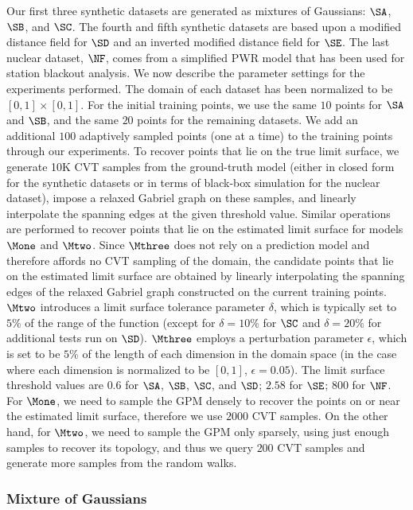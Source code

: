 Our first three synthetic datasets are generated as mixtures of Gaussians: $\SA$, $\SB$, and $\SC$.
%
The fourth and fifth synthetic datasets are based upon a modified distance field for $\SD$ and an inverted modified distance field for $\SE$.
%
The last nuclear dataset, $\NF$, comes from a simplified PWR model that has been used for station blackout analysis.
%
We now describe the parameter settings for the experiments performed.
%
The domain of each dataset has been normalized to be $[0,1] \times [0,1]$.
%
For the initial training points, we use the same $10$ points for $\SA$ and $\SB$, and the same $20$ points for the remaining datasets.
%
We add an additional $100$ adaptively sampled points (one at a time) to the training points through our experiments.
%
To recover points that lie on the true limit surface, we generate 10K CVT samples from the ground-truth model (either in closed form for the synthetic datasets or in terms of black-box simulation for the nuclear dataset), impose a relaxed Gabriel graph on these samples, and linearly interpolate the spanning edges at the given threshold value.
%
Similar operations are performed to recover points that lie on the estimated limit surface for models $\Mone$ and $\Mtwo$.
%
Since $\Mthree$ does not rely on a prediction model and therefore affords no CVT sampling of the domain, the candidate points that lie on the estimated limit surface are obtained by linearly interpolating the spanning edges of the relaxed Gabriel graph constructed on the current training points.
%
$\Mtwo$ introduces a limit surface tolerance parameter $\delta$, which is typically set to $5\%$ of the range of the function (except for $\delta = 10\%$ for $\SC$ and $\delta = 20\%$ for additional tests run on $\SD$).
%
$\Mthree$ employs a perturbation parameter $\epsilon$, which is set to be $5\%$ of the length of each dimension in the domain space (in the case where each dimension is normalized to be $[0,1]$, $\epsilon = 0.05$).
%
The limit surface threshold values are $0.6$ for $\SA$, $\SB$, $\SC$, and $\SD$;
%
$2.58$ for $\SE$; $800$ for $\NF$.
%
For $\Mone$, we need to sample the GPM densely to recover the points on or near the estimated limit surface, therefore we use $2000$ CVT samples.
%
On the other hand, for $\Mtwo$, we need to sample the GPM only sparsely, using just enough samples to recover its topology, and thus we query $200$ CVT samples and generate more samples from the random walks.


\subsubsection{Mixture of Gaussians}

